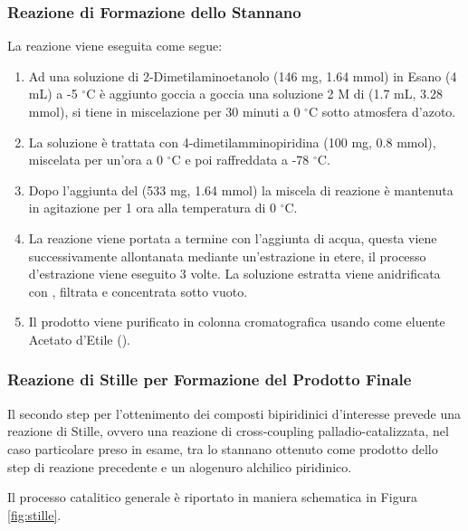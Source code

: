 \documentclass[a4paper, 12pt]{article}
\begin{document}
\subsubsection{Reazione di Formazione dello Stannano }
La reazione viene eseguita come segue:
\begin{enumerate}
	\item Ad una soluzione di 2-Dimetilaminoetanolo (146 mg, 1.64 mmol) in Esano (4 mL) a -5 $^\circ$C è aggiunto goccia a goccia una soluzione 2 M di  (1.7 mL, 3.28 mmol), si tiene in miscelazione per 30 minuti a 0 $^\circ$C sotto atmosfera d'azoto.
	\item La soluzione è trattata con 4-dimetilamminopiridina (100 mg, 0.8 mmol), miscelata per un’ora a 0 $^\circ$C e poi raffreddata a -78 $^\circ$C.
	\item Dopo l'aggiunta del  (533 mg, 1.64 mmol) la miscela di reazione è mantenuta in agitazione per 1 ora alla temperatura di 0 $^\circ$C.
	\item La reazione viene portata a termine con l'aggiunta di acqua, questa viene successivamente allontanata mediante un'estrazione in etere, il processo d'estrazione viene eseguito 3 volte. La soluzione estratta viene anidrificata con , filtrata e concentrata sotto vuoto.
	\item Il prodotto viene purificato in colonna cromatografica usando come eluente Acetato d'Etile ().
\end{enumerate}

\subsubsection{Reazione di Stille per Formazione del Prodotto Finale}
Il secondo step per l'ottenimento dei composti bipiridinici d'interesse prevede una reazione di Stille, ovvero una reazione di cross-coupling palladio-catalizzata, nel caso particolare preso in esame, tra lo stannano ottenuto come prodotto dello step di reazione precedente e un alogenuro alchilico piridinico.\cite{clayden_organic_2012}

Il processo catalitico generale è riportato in maniera schematica in Figura \ref{fig:stille}.
\end{document}
